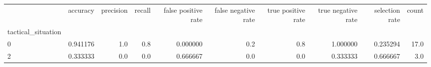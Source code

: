 \begin{tabular}{lrrrrrrrrr}
\toprule
{} &  accuracy &  precision &  recall &  false positive rate &  false negative rate &  true positive rate &  true negative rate &  selection rate &  count \\
tactical\_situation &           &            &         &                      &                      &                     &                     &                 &        \\
\midrule
0                  &  0.941176 &        1.0 &     0.8 &             0.000000 &                  0.2 &                 0.8 &            1.000000 &        0.235294 &   17.0 \\
2                  &  0.333333 &        0.0 &     0.0 &             0.666667 &                  0.0 &                 0.0 &            0.333333 &        0.666667 &    3.0 \\
\bottomrule
\end{tabular}
